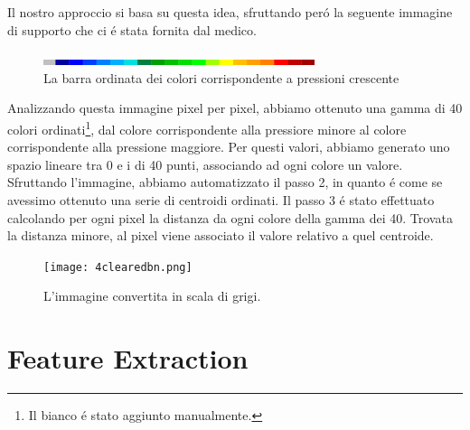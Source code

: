 \documentclass[11pt,a4paper]{article}
\begin{document}
Il nostro approccio si basa su questa idea, sfruttando per\'o la seguente immagine di supporto che ci \'e stata fornita dal medico.
\begin{figure}
\centering
\includegraphics[keepaspectratio, width=300px]{color.png}
\caption{La barra ordinata dei colori corrispondente a pressioni crescente}
\end{figure}
Analizzando questa immagine pixel per pixel, abbiamo ottenuto una gamma di 40 colori ordinati\footnote{Il bianco \'e stato aggiunto manualmente.}, dal colore corrispondente alla pressiore minore al colore corrispondente alla pressione maggiore. Per questi valori, abbiamo generato uno spazio lineare tra 0 e i di 40 punti, associando ad ogni colore un valore. Sfruttando l'immagine, abbiamo automatizzato il passo 2, in quanto \'e come se avessimo ottenuto una serie di centroidi ordinati. Il passo 3 \'e stato effettuato calcolando per ogni pixel la distanza da ogni colore della gamma dei 40. Trovata la distanza minore, al pixel viene associato il valore relativo a quel centroide.

\begin{figure}
\centering
\texttt{[image: 4clearedbn.png]}
\caption{L'immagine convertita in scala di grigi.}
\end{figure}

\section{Feature Extraction}

\label{sec:implementation}
\end{document}

